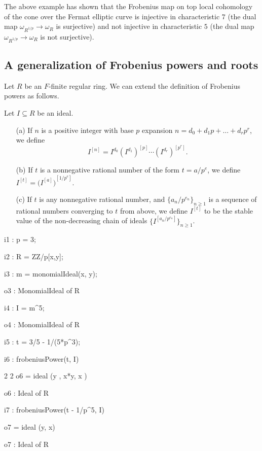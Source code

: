 \documentclass{amsart}
\renewcommand{\geq}{\geqslant}
\begin{document}
The above example has shown that the Frobenius map on top local cohomology of the cone over the Fermat elliptic curve is injective in characteristic $7$ (the dual map $\omega_{R^{1/p}} \to \omega_R$ is surjective) and not injective in characteristic $5$ (the dual map $\omega_{R^{1/p}} \to \omega_R$ is not surjective).

\subsection{A generalization of Frobenius powers and roots}

Let $R$ be an $F$-finite regular ring.
We can extend the definition of Frobenius powers as follows.

\begin{definition}
Let  $I\subseteq R$ be an ideal.
\begin{enumerate}
 \item[(a)] If $n$ is a positive integer with base $p$ expansion  $n=d_0 + d_1 p +  \dots + d_r p^r$, we define
\[ I^{[n]}=I^{d_0} (I^{d_1})^{[p]} \cdots  (I^{d_r})^{[p^r]}.\]
 \item[(b)] If $t$ is a nonnegative rational number of the form $t = a/p^e$, we define  $I^{[t]} = {\big(I^{[a]}\big)}^{[1/p^e]}.$
 \item[(c)] If $t$ is any nonnegative rational number, and $\{a_n/p^{e_n}\}_{n\geq 1}$ is a sequence of rational numbers converging to $t$ from above, we define $I^{[t]}$
 to be the stable value of the non-decreasing chain of ideals $\{I^{[a_n/p^{e_n}]}\}_{n\geq 1}$.
\end{enumerate}
\end{definition}

\medskip
{\small
\begin{MyVerbatim}
i1 : p = 3;

i2 : R = ZZ/p[x,y];

i3 : m = monomialIdeal(x, y);

o3 : MonomialIdeal of R

i4 : I = m^5;

o4 : MonomialIdeal of R

i5 : t = 3/5 - 1/(5*p^3);

i6 : frobeniusPower(t, I)

             2        2
o6 = ideal (y , x*y, x )

o6 : Ideal of R

i7 : frobeniusPower(t - 1/p^5, I)

o7 = ideal (y, x)

o7 : Ideal of R
\end{MyVerbatim}
}
\medskip
\end{document}

